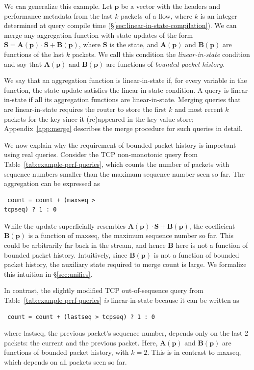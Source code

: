 We can generalize this example. Let $\mathbf{p}$ be a vector with the headers
and performance metadata from the last $k$ packets of a flow, where $k$ is an
integer determined at query compile time
(\S\ref{sec:linear-in-state-compilation}).  We can merge any aggregation
function with state updates of the form $\boldsymbol{S} =
\boldsymbol{A}(\mathbf{p}) \cdot \boldsymbol{S} + \boldsymbol{B}(\mathbf{p})$,
where $\boldsymbol{S}$ is the state, and $\boldsymbol{A}(\mathbf{p})$ and
$\boldsymbol{B}(\mathbf{p})$ are functions of the last $k$ packets. We call
this condition the {\em linear-in-state} condition and say that
$\boldsymbol{A}(\mathbf{p})$ and $\boldsymbol{B}(\mathbf{p})$ are functions of
{\em bounded packet history.}

 We say that an aggregation function is linear-in-state if, for every variable
in the function, the state update satisfies the linear-in-state condition. A
query is linear-in-state if all its aggregation functions are linear-in-state.
Merging queries that are linear-in-state requires the router to store the first
$k$ and most recent $k$ packets for the key since it (re)appeared in the
key-value store; Appendix~\ref{app:merge} describes the merge procedure for
such queries in detail.

We now explain why the requirement of bounded packet history is important using
real queries.  Consider the TCP non-monotonic query from
Table~\ref{tab:example-perf-queries}, which counts the number of packets with
sequence numbers smaller than the maximum sequence number seen so far. The
aggregation can be expressed as \begin{lstlisting} count = count + (maxseq >
tcpseq) ? 1 : 0 \end{lstlisting} While the update superficially resembles
$\boldsymbol{A}(\mathbf{p}) \cdot \boldsymbol{S} + \boldsymbol{B}(\mathbf{p})$,
the coefficient $\boldsymbol{B}(\mathbf{p})$ is a function of {\ct maxseq}, the
maximum sequence number so far. This could be arbitrarily far back in the
stream, and hence $\boldsymbol{B}$ here is not a function of bounded packet
history. Intuitively, since $\boldsymbol{B}(\mathbf{p})$ is not a function of
bounded packet history, the auxiliary state required to merge {\ct count} is
large. We formalize this intuition in \S\ref{sec:unifies}.

In contrast, the slightly modified TCP out-of-sequence query from
Table~\ref{tab:example-perf-queries} {\em is} linear-in-state because it can
be written as \begin{lstlisting} count = count + (lastseq > tcpseq) ? 1 : 0
\end{lstlisting} where {\ct lastseq}, the previous packet's sequence number,
depends only on the last 2 packets: the current and the previous packet. Here,
$\boldsymbol{A}(\mathbf{p})$ and $\boldsymbol{B}(\mathbf{p})$ are functions of
bounded packet history, with $k = 2$. This is in contrast to {\ct maxseq},
which depends on all packets seen so far.

